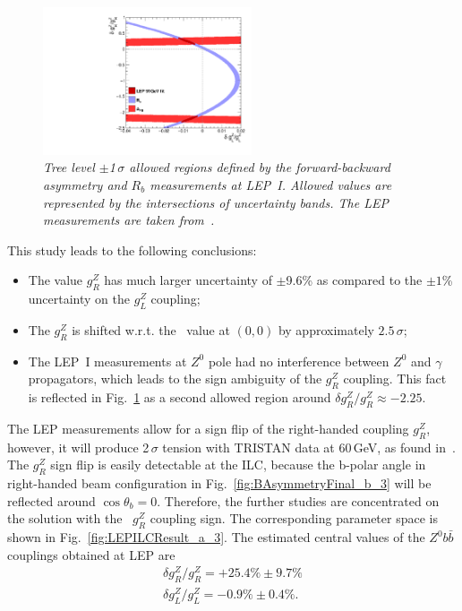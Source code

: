 \begin{figure}
	{\centering
		\includegraphics[width=0.55\textwidth]{ILD/plots/lep-result-full.pdf}
		\caption{\sl  Tree level $\pm$1\,$\sigma$ allowed regions defined by the forward-backward asymmetry and $R_b$ measurements at LEP~I. Allowed values are represented by the intersections of uncertainty bands. The LEP measurements are taken from~\cite{bib:LEPpuzzle}. 
		}
		\label{fig:LEPResultFull_3}
	}
	
\end{figure}
This study leads to the following conclusions:
\begin{itemize}
	\item The value $g_R^Z$ has much larger uncertainty of $\pm$9.6\% as compared to the $\pm 1$\% uncertainty on the $g_L^Z$ coupling;
	\item The $g_R^Z$ is shifted w.r.t. the \sm\ value at $(0,0)$ by approximately $2.5\,\sigma$;
	\item The LEP~I measurements at $Z^0$ pole had no interference between $Z^0$ and $\gamma$ propagators, which leads to the sign ambiguity of the $g_R^Z$ coupling. This fact is reflected in Fig.~\ref{fig:LEPResultFull_3} as a second allowed region around $\delta g_R^Z / g_R^Z \approx -2.25$. 
\end{itemize}
The LEP measurements allow for a sign flip of the right-handed coupling $g_R^Z$, however, it will produce 2\,$\sigma$ tension with TRISTAN data at 60\,GeV, as found in~\cite{bib:LEPpuzzle}.
The $g_R^Z$ sign flip is easily detectable at the ILC, because the b-polar angle in right-handed beam configuration in Fig.~\ref{fig:BAsymmetryFinal_b_3} will be reflected around $\cos\theta_b = 0$. 
Therefore, the further studies are concentrated on the solution with the \sm\ $g_R^Z$ coupling sign. 
The corresponding parameter space is shown in Fig.~\ref{fig:LEPILCResult_a_3}.
The estimated  central values of the $Z^0b\bar{b}$ couplings obtained at LEP are
\begin{eqnarray}
	\delta g_R^Z / g_R^Z = +25.4\% \pm 9.7\% \label{formula:LEPgR} \\
	\delta  g_L^Z / g_L^Z = -0.9\% \pm 0.4\%.
\end{eqnarray}


